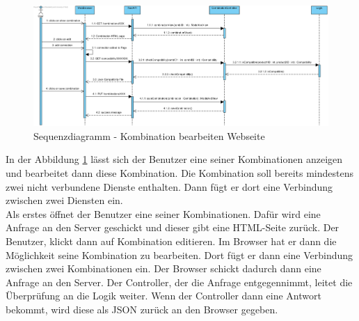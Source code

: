 \begin{figure}[h]
	\centering
	\includegraphics[width=\textwidth]{sequenzdiagramm/Kombination_bearbeiten}
	\caption{Sequenzdiagramm - Kombination bearbeiten Webseite}
	\label{fig:sequenz-bearbKombWeb}
\end{figure}
\FloatBarrier
In der Abbildung \ref{fig:sequenz-bearbKombWeb} lässt sich der Benutzer eine seiner Kombinationen anzeigen und bearbeitet dann diese Kombination.
Die Kombination soll bereits mindestens zwei nicht verbundene Dienste enthalten.
Dann fügt er dort eine Verbindung zwischen zwei Diensten ein. \\
Als erstes öffnet der Benutzer eine seiner Kombinationen.
Dafür wird eine Anfrage an den Server geschickt und dieser gibt eine HTML-Seite zurück.
Der Benutzer, klickt dann auf Kombination editieren.
Im Browser hat er dann die Möglichkeit seine Kombination zu bearbeiten.
Dort fügt er dann eine Verbindung zwischen zwei Kombinationen ein.
Der Browser schickt dadurch dann eine Anfrage an den Server.
Der Controller, der die Anfrage entgegennimmt, leitet die Überprüfung an die Logik weiter.
Wenn der Controller dann eine Antwort bekommt, wird diese als JSON zurück an den Browser gegeben.



